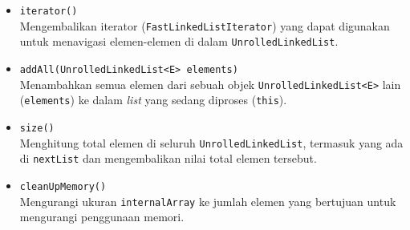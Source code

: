 \begin{itemize}
\begin{itemize}
        \item \texttt{iterator()}
        \\Mengembalikan iterator (\texttt{FastLinkedListIterator}) yang dapat digunakan untuk menavigasi elemen-elemen di dalam \texttt{UnrolledLinkedList}.
        \item \texttt{addAll(UnrolledLinkedList<E> elements)}
        \\ Menambahkan semua elemen dari sebuah objek \texttt{UnrolledLinkedList<E>} lain (\texttt{elements}) ke dalam \textit{list} yang sedang diproses (\texttt{this}).
        \item \texttt{size()}
        \\ Menghitung total elemen di seluruh \texttt{UnrolledLinkedList}, termasuk yang ada di \texttt{nextList} dan mengembalikan nilai total elemen tersebut.
        \item \texttt{cleanUpMemory()}
        \\Mengurangi ukuran \texttt{internalArray} ke jumlah elemen yang bertujuan untuk mengurangi penggunaan memori.
    \end{itemize}
\end{itemize}

